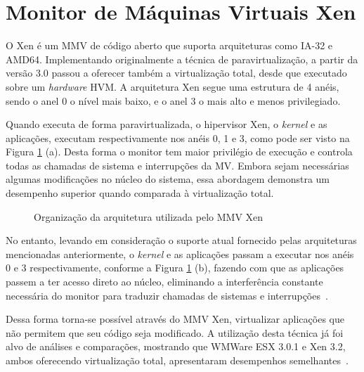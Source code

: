 \documentclass[times, 10pt,twocolumn]{article}
\def\hw{\textit{hardware}\xspace}
\def\kernel{\textit{kernel}\xspace}
\def\hpv{hipervisor\xspace}
\def\mmv{{Monitor de Máquinas Virtuais}\xspace}
\begin{document}
\section{\mmv Xen}\label{s:mmv_xen}
O Xen é um MMV de código aberto que suporta  arquiteturas como IA-32 e AMD64.
Implementando originalmente a técnica de paravirtualização, a partir da versão 3.0 
passou a oferecer também a virtualização total, desde que executado sobre um \hw HVM.
A arquitetura Xen segue uma estrutura de 4 anéis, sendo o anel 0 o nível mais baixo, 
e o anel 3 o mais alto e menos privilegiado.

Quando executa de forma paravirtualizada, o \hpv Xen, o \kernel e as aplicações, 
executam respectivamente nos anéis 0, 1 e 3, como pode ser visto na Figura 
\ref{fig:aneis} (a). Desta forma o monitor tem maior privilégio de execução e 
controla todas as chamadas de sistema e interrupções da MV. Embora sejam necessárias 
algumas modificações no núcleo do sistema, essa abordagem demonstra um desempenho 
superior quando comparada à virtualização total. 

\begin{figure}[!htb]
\centering
{}
\caption{Organização da arquitetura utilizada pelo MMV Xen}
\label{fig:aneis}
\end{figure}

No entanto, levando em consideração o suporte atual fornecido pelas arquiteturas 
mencionadas anteriormente, o \kernel e as aplicações passam a executar nos anéis 0 e 3 
respectivamente, conforme a Figura \ref{fig:aneis} (b), fazendo com que as aplicações 
passem a ter acesso direto ao núcleo, eliminando a interferência constante necessária 
do monitor para traduzir chamadas de sistemas e interrupções~\cite{xenhpv}. 

Dessa forma torna-se possível através do MMV Xen, virtualizar aplicações que não 
permitem que seu código seja modificado. A utilização desta técnica já foi alvo
de análises e comparações, mostrando que WMWare ESX 3.0.1 e Xen 3.2, ambos
oferecendo virtualização total, apresentaram desempenhos semelhantes~\cite{comparacao,
xenbr}. 
\end{document}
